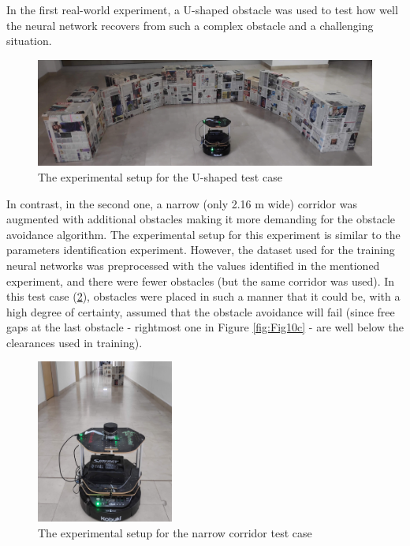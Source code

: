 In the first real-world experiment, a U-shaped obstacle was used to test how well the neural network recovers from such a complex obstacle and a challenging situation. 

\begin{figure}
    \centering
    \includegraphics[width=\textwidth]{slike/Fig03_08.png}
    \caption{The experimental setup for the U-shaped test case}
    \label{fig:UshapeExp}
\end{figure}

In contrast, in the second one, a narrow (only 2.16 m wide) corridor was augmented with additional obstacles making it more demanding for the obstacle avoidance algorithm. The experimental setup for this experiment is similar to the parameters identification experiment. However, the dataset used for the training neural networks was preprocessed with the values identified in the mentioned experiment, and there were fewer obstacles (but the same corridor was used). In this test case (\cref{fig:CorridorExp}), obstacles were placed in such a manner that it could be, with a high degree of certainty, assumed that the obstacle avoidance will fail (since free gaps at the last obstacle - rightmost one in Figure \ref{fig:Fig10c} - are well below the clearances used in training).

\begin{figure}
    \centering
    \includegraphics[width=0.4\textwidth]{slike/Fig03_09.png}
    \caption{The experimental setup for the narrow corridor test case}
    \label{fig:CorridorExp}
\end{figure}

